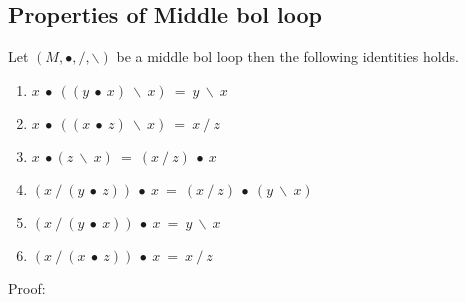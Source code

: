 \subsection{Properties of Middle bol loop}
Let $(M, ∙, /, \backslash)$ be a middle bol loop then the following
identities holds.
\begin{enumerate}
\item \(x\ ∙\ ((y\ ∙\ x)\ \backslash \ x)\ =\ y\ \backslash\ x\) 
\item \(x\ ∙\ ((x\ ∙\ z)\ \backslash \ x)\ =\ x\ /\ z\)
\item \(x\ ∙ (z\ \backslash\ x)\ =\ (x\ /\ z)\ ∙\ x\)
\item \((x\ /\ (y\ ∙\ z))\ ∙\ x\ =\ (x\ /\ z)\ ∙\ (y\ \backslash\ x)\)
\item \((x\ /\ (y\ ∙\ x))\ ∙\ x\ =\ y\ \backslash \ x\)
\item \((x\ /\ (x\ ∙\ z))\ ∙\ x\ = \ x\ /\  z\)
\end{enumerate}
Proof:
